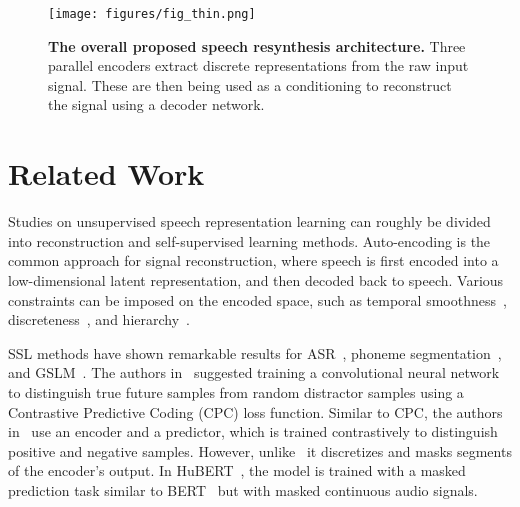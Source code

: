 \begin{figure}[t!]
\centering
\texttt{[image: figures/fig\_thin.png]}
\caption{\textbf{The overall proposed speech resynthesis architecture.} Three parallel encoders extract discrete representations from the raw input signal. These are then being used as a conditioning to reconstruct the signal using a decoder network.} 
\label{fig:arch}
\vspace{-0.6cm}
\end{figure}

\vspace{-0.1cm}
\section{Related Work}
\vspace{-0.1cm}
Studies on unsupervised speech representation learning can roughly be divided into reconstruction and self-supervised learning methods. 
Auto-encoding is the common approach for signal reconstruction,
where speech is first encoded into a low-dimensional latent representation, and then decoded back to speech. Various constraints can be imposed on the encoded space, such as temporal smoothness~\cite{ebbers2017hidden}, discreteness~\cite{van2017neural}, and hierarchy~\cite{hsu2017unsupervised}.

SSL methods have shown remarkable results for ASR~\cite{schneider2019wav2vec, baevski2020wav2vec}, phoneme segmentation~\cite{kreuk2020self}, and GSLM~\cite{lakhotia2021generative}. The authors in~\cite{oord2018representation, schneider2019wav2vec} suggested training a convolutional neural network to distinguish true future samples from random distractor samples using a Contrastive Predictive Coding (CPC) loss function. Similar to CPC, the authors in~\cite{baevski2020wav2vec} use an encoder and a predictor, which is trained contrastively to distinguish positive and negative samples. However, unlike~\cite{schneider2019wav2vec} it discretizes and masks segments of the encoder's output. In HuBERT~\cite{hsu2020hubert}, the model is trained with a masked prediction task similar to BERT~\cite{devlin-etal-2019-bert} but with masked continuous audio signals. 

